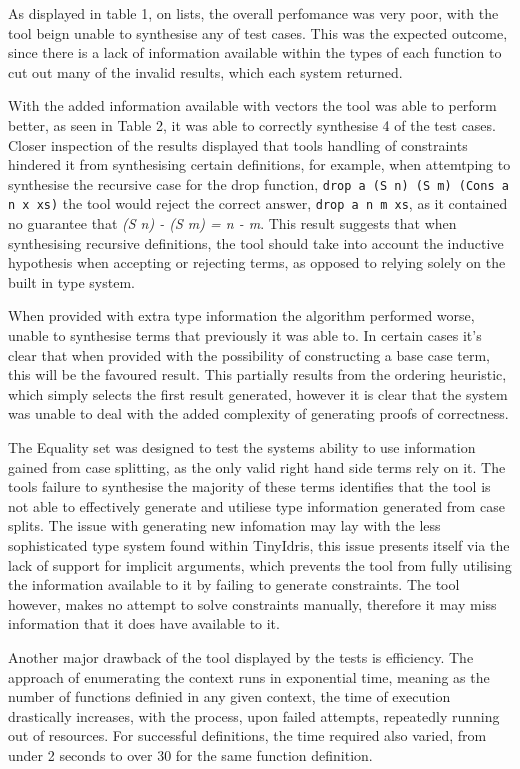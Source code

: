 \documentclass[a4paper]{article}
\begin{document}
As displayed in table 1, on lists, the overall perfomance
was very poor, with the tool beign unable to synthesise
any of test cases. This was the expected outcome, since there
is a lack of information available within the types of
each function to cut out many of the invalid results,
which each system returned. 

With the added information available with vectors the tool was 
able to perform better, as seen in Table 2, it was able to correctly
synthesise 4 of the test cases. Closer inspection of the results displayed that tools
handling of constraints hindered it from synthesising certain definitions,
for example, when attemtping to synthesise the recursive case for the
drop function, \texttt{drop a (S n) (S m) (Cons a n x xs)} the tool
would reject the correct answer, \texttt{drop a n m xs}, as it
contained no guarantee that \textit{(S n) - (S m) = n - m}. This
result suggests that when synthesising recursive definitions, the
tool should take into account the inductive hypothesis when
accepting or rejecting terms, as opposed to relying solely on the
built in type system.

When provided with extra type information the algorithm performed
worse, unable to synthesise terms that previously it was able to.
In certain cases it's clear that when provided with the possibility
of constructing a base case term, this will be the favoured
result. This partially results from the ordering heuristic, which simply
selects the first result generated, however it is clear that the system
was unable to deal with the added complexity of generating proofs of
correctness. 

The Equality set was designed to test the systems ability to use
information gained from case splitting, as the only valid right hand side
terms rely on it. The tools failure to synthesise the majority of these terms
identifies that the tool is not able to effectively generate and utiliese
type information generated from case splits. The issue with generating new infomation
may lay with the less sophisticated type system found within TinyIdris, this issue
presents itself via the lack of support for implicit arguments, which prevents the
tool from fully utilising the information available to it by failing to generate
constraints. The tool however, makes no attempt to solve constraints manually,
therefore it may miss information that it does have available to it.

Another major drawback of the tool displayed by the tests is efficiency.
The approach of enumerating the context runs in exponential time, meaning as
the number of functions definied in any given context, the time of execution
drastically increases, with the process, upon failed attempts, repeatedly
running out of resources. For successful definitions, the time required also
varied, from under 2 seconds to over 30 for the same function definition. 
\end{document}

